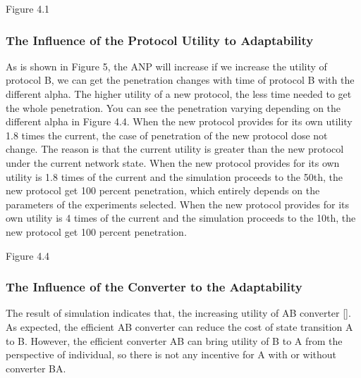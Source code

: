 \documentclass{article}
\begin{document}
Figure 4.1

\subsubsection{The Influence of the Protocol Utility to Adaptability}
As is shown in Figure 5, the ANP will increase if we increase the utility of protocol B, we can get the penetration changes with time of protocol B with the different alpha. The higher utility of a new protocol, the less time needed to get the whole penetration. You can see the penetration varying depending on the different alpha in Figure 4.4. When the new protocol provides for its own utility 1.8 times the current, the case of penetration of the new protocol dose not change. The reason is that the current utility is greater than the new protocol under the current network state. When the new protocol provides for its own utility is 1.8 times of the current and the simulation proceeds to the 50th,  the new protocol get 100 percent penetration, which entirely depends on the parameters of the experiments selected. When the new protocol provides for its own utility is 4 times of the current and the simulation proceeds to the 10th, the new protocol get 100 percent penetration. 

Figure 4.4

\subsubsection{The Influence of the Converter to the Adaptability}
The result of simulation indicates that, the increasing utility of AB converter []. As expected, the efficient AB converter can reduce the cost of state transition A to B. However, the efficient converter AB can bring utility of B to A from the perspective of individual, so there is not any incentive for A with or without converter BA. 
\end{document}
